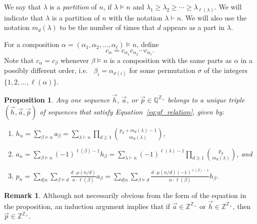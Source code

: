 \documentclass[11pt]{amsart}
\newcommand{\defncolor}{\color{darkred}}
\newcommand{\defn}[1]{{\defncolor\emph{#1}}} %
\newtheorem{proposition}[theorem]{Proposition}
\theoremstyle{definition}
\newtheorem{remark}[theorem]{Remark}
\numberwithin{equation}{section}
\def\ZZ{{\mathbb Z}}
\def\QQ{{\mathbb Q}}
\begin{document}
We say that $\lambda$ is a \defn{partition} of $n$, if $\lambda \vDash n$ and
$\lambda_1 \geq \lambda_2 \geq \cdots \geq \lambda_{\ell(\lambda)}$.  We will indicate that $\lambda$ is a partition
of $n$ with the notation $\lambda \vdash n$.  We will also use the notation $m_d(\lambda)$ to be the number of times
that $d$ appears as a part in $\lambda$.

For a composition $\alpha = (\alpha_{1}, \alpha_{2}, \ldots, \alpha_{\ell}) \vDash n$, define
\[
c_{\alpha} = c_{\alpha_{1}} c_{\alpha_{2}} \cdots c_{\alpha_{\ell}}.
\]
Note that $c_{\alpha} = c_{\beta}$ whenever $\beta \vDash n$ is a composition with the same parts as $\alpha$ in a possibly different order, i.e.~ $\beta_{i} = \alpha_{\sigma(i)}$ for some permutation $\sigma$ of the integers $\{1,2, \ldots, \ell(\alpha)\}$.

\begin{proposition}
\label{prop:sequences}
Any one sequence $\vec{h}$, $\vec{a}$, or $\vec{p} \in \QQ^{\ZZ_+}$ belongs to a unique triple $(\vec{h}, \vec{a}, \vec{p})$ of sequences that satisfy Equation~\eqref{eq:gf_relation}, given by:
\begin{enumerate}[label = (\roman*), itemsep = 1em]
\item $\displaystyle h_{n}
= \sum_{\beta \vDash n} a_\beta
= \sum_{\lambda \vdash n} \prod_{d \geq 1} \binom{p_d + m_d(\lambda) -1}{m_d(\lambda)}$, 

\item $\displaystyle a_n
= \sum_{\beta \vDash n} (-1)^{\ell(\beta)-1} h_\beta
= \sum_{\lambda \vdash n} (-1)^{\ell(\lambda)-1} \prod_{d \geq 1} \binom{p_d}{m_d(\lambda)}$, and

\item $\displaystyle p_n
= \sum_{d|n} \sum_{\beta \vDash d} \frac{d\cdot \mu(n/d)}{n \cdot \ell(\beta)} a_\beta
= \sum_{d|n} \sum_{\beta \vDash d} \frac{d\cdot \mu(n/d) (-1)^{\ell(\beta)-1}}{n \cdot \ell(\beta)} h_\beta$.

\end{enumerate}
\end{proposition}

\begin{remark} Although not necessarily obvious from the form of the equation in the proposition, 
an induction argument implies that if $\vec{a} \in \ZZ^{\ZZ_+}$ or $\vec{h} \in \ZZ^{\ZZ_+}$,
then $\vec{p} \in \ZZ^{\ZZ_+}$.
\end{remark}
\end{document}

